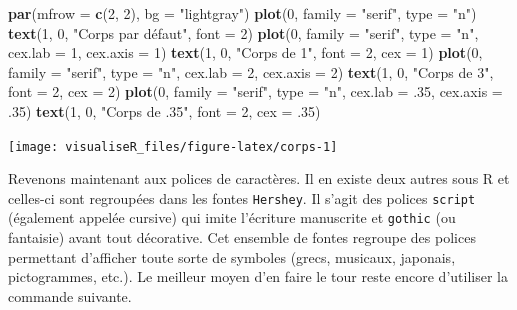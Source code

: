 \documentclass[]{article}
\newenvironment{Shaded}{\begin{snugshade}}{\end{snugshade}}
\newcommand{\DataTypeTok}[1]{\textcolor[rgb]{0.13,0.29,0.53}{#1}}
\newcommand{\DecValTok}[1]{\textcolor[rgb]{0.00,0.00,0.81}{#1}}
\newcommand{\FloatTok}[1]{\textcolor[rgb]{0.00,0.00,0.81}{#1}}
\newcommand{\KeywordTok}[1]{\textcolor[rgb]{0.13,0.29,0.53}{\textbf{#1}}}
\newcommand{\NormalTok}[1]{#1}
\newcommand{\StringTok}[1]{\textcolor[rgb]{0.31,0.60,0.02}{#1}}
\begin{document}
\begin{Shaded}
\begin{Highlighting}[]
\KeywordTok{par}\NormalTok{(}\DataTypeTok{mfrow =} \KeywordTok{c}\NormalTok{(}\DecValTok{2}\NormalTok{, }\DecValTok{2}\NormalTok{), }\DataTypeTok{bg =} \StringTok{"lightgray"}\NormalTok{)}
\KeywordTok{plot}\NormalTok{(}\DecValTok{0}\NormalTok{, }\DataTypeTok{family =} \StringTok{"serif"}\NormalTok{, }\DataTypeTok{type =} \StringTok{"n"}\NormalTok{)}
\KeywordTok{text}\NormalTok{(}\DecValTok{1}\NormalTok{, }\DecValTok{0}\NormalTok{, }\StringTok{"Corps par défaut"}\NormalTok{, }\DataTypeTok{font =} \DecValTok{2}\NormalTok{)}
\KeywordTok{plot}\NormalTok{(}\DecValTok{0}\NormalTok{, }\DataTypeTok{family =} \StringTok{"serif"}\NormalTok{, }\DataTypeTok{type =} \StringTok{"n"}\NormalTok{, }\DataTypeTok{cex.lab =} \DecValTok{1}\NormalTok{, }\DataTypeTok{cex.axis =} \DecValTok{1}\NormalTok{)}
\KeywordTok{text}\NormalTok{(}\DecValTok{1}\NormalTok{, }\DecValTok{0}\NormalTok{, }\StringTok{"Corps de 1"}\NormalTok{, }\DataTypeTok{font =} \DecValTok{2}\NormalTok{, }\DataTypeTok{cex =} \DecValTok{1}\NormalTok{)}
\KeywordTok{plot}\NormalTok{(}\DecValTok{0}\NormalTok{, }\DataTypeTok{family =} \StringTok{"serif"}\NormalTok{, }\DataTypeTok{type =} \StringTok{"n"}\NormalTok{, }\DataTypeTok{cex.lab =} \DecValTok{2}\NormalTok{, }\DataTypeTok{cex.axis =} \DecValTok{2}\NormalTok{)}
\KeywordTok{text}\NormalTok{(}\DecValTok{1}\NormalTok{, }\DecValTok{0}\NormalTok{, }\StringTok{"Corps de 3"}\NormalTok{, }\DataTypeTok{font =} \DecValTok{2}\NormalTok{, }\DataTypeTok{cex =} \DecValTok{2}\NormalTok{)}
\KeywordTok{plot}\NormalTok{(}\DecValTok{0}\NormalTok{, }\DataTypeTok{family =} \StringTok{"serif"}\NormalTok{, }\DataTypeTok{type =} \StringTok{"n"}\NormalTok{, }\DataTypeTok{cex.lab =} \FloatTok{.35}\NormalTok{, }\DataTypeTok{cex.axis =} \FloatTok{.35}\NormalTok{)}
\KeywordTok{text}\NormalTok{(}\DecValTok{1}\NormalTok{, }\DecValTok{0}\NormalTok{, }\StringTok{"Corps de .35"}\NormalTok{, }\DataTypeTok{font =} \DecValTok{2}\NormalTok{, }\DataTypeTok{cex =} \FloatTok{.35}\NormalTok{)}
\end{Highlighting}
\end{Shaded}

\begin{center}\texttt{[image: visualiseR\_files/figure-latex/corps-1]} \end{center}

Revenons maintenant aux polices de caractères. Il en existe deux autres sous R et celles-ci sont regroupées dans les fontes \texttt{Hershey}. Il s'agit des polices \texttt{script} (également appelée cursive) qui imite l'écriture manuscrite et \texttt{gothic} (ou fantaisie) avant tout décorative. Cet ensemble de fontes regroupe des polices permettant d'afficher toute sorte de symboles (grecs, musicaux, japonais, pictogrammes, etc.). Le meilleur moyen d'en faire le tour reste encore d'utiliser la commande suivante.
\end{document}
